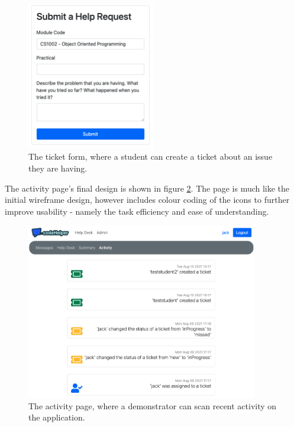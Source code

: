 \begin{figure}[H]
    \centering
    \includegraphics[width=0.5\textwidth]{7design/images/ticketForm.png}
    \caption{The ticket form, where a student can create a ticket about an issue they are having.}
    \label{fig:ticketForm}
\end{figure}

The activity page's final design is shown in figure \ref{fig:activity}. The page is much like the initial wireframe design, however includes colour coding of the icons to further improve usability - namely the task efficiency and ease of understanding. 

\begin{figure}[H]
    \centering
    \includegraphics[width=0.9\textwidth]{7design/images/activity.png}
    \caption{The activity page, where a demonstrator can scan recent activity on the application.}
    \label{fig:activity}
\end{figure}

